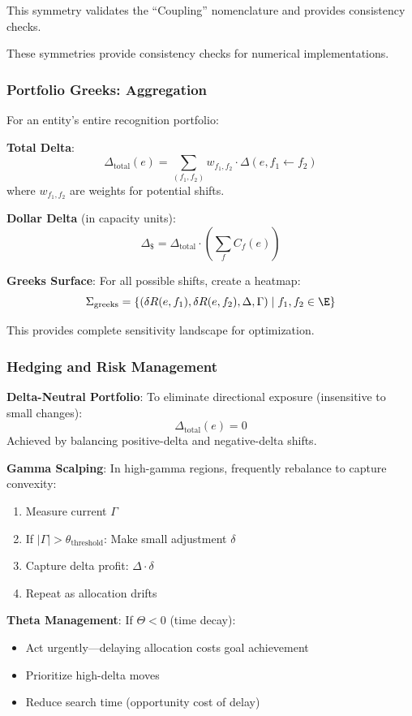 This symmetry validates the ``Coupling'' nomenclature and provides consistency checks.

These symmetries provide consistency checks for numerical implementations.

\subsubsection{Portfolio Greeks: Aggregation}

For an entity's entire recognition portfolio:

\textbf{Total Delta}:
\[ \Delta_{\text{total}}(e) = \sum_{(f_1,f_2)} w_{f_1,f_2} \cdot \Delta(e, f_1 \leftarrow f_2) \]
where $w_{f_1,f_2}$ are weights for potential shifts.

\textbf{Dollar Delta} (in capacity units):
\[ \Delta_\$ = \Delta_{\text{total}} \cdot \left(\sum_f C_f(e)\right) \]

\textbf{Greeks Surface}: For all possible shifts, create a heatmap:
\[ \Sigma_{\text{greeks}} = \{(\delta R(e,f_1), \delta R(e,f_2), \Delta, \Gamma) \mid f_1, f_2 \in \E\} \]

This provides complete sensitivity landscape for optimization.

\subsubsection{Hedging and Risk Management}

\textbf{Delta-Neutral Portfolio}:
To eliminate directional exposure (insensitive to small changes):
\[ \Delta_{\text{total}}(e) = 0 \]
Achieved by balancing positive-delta and negative-delta shifts.

\textbf{Gamma Scalping}:
In high-gamma regions, frequently rebalance to capture convexity:
\begin{enumerate}
\item Measure current $\Gamma$
\item If $|\Gamma| > \theta_{\text{threshold}}$: Make small adjustment $\delta$
\item Capture delta profit: $\Delta \cdot \delta$
\item Repeat as allocation drifts
\end{enumerate}

\textbf{Theta Management}:
If $\Theta < 0$ (time decay):
\begin{itemize}
\item Act urgently---delaying allocation costs goal achievement
\item Prioritize high-delta moves
\item Reduce search time (opportunity cost of delay)
\end{itemize}

